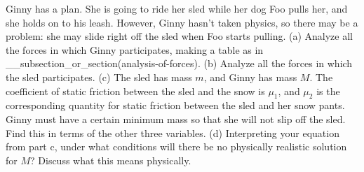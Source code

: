  Ginny has a plan. She is going to ride her sled while
her dog Foo pulls her, and she holds on to his leash.
However, Ginny hasn't taken physics,
so there may be a problem: she may slide right off the sled
when Foo starts pulling.\hwendpart
 (a) Analyze all the forces in which
Ginny participates, making a table as in __subsection_or_section(analysis-of-forces).\hwendpart
 (b) Analyze all the forces in which the sled participates.\hwendpart
 (c) The sled has mass $m$, and Ginny has mass $M$. The
coefficient of static friction between the sled and the snow
is $\mu_1$, and $\mu_2$ is the corresponding quantity for
static friction between the sled and her snow pants. Ginny
must have a certain minimum mass so that she will not slip
off the sled. Find this in terms of the other three
variables.\answercheck\hwendpart
(d) Interpreting your equation from part c, 
under what conditions will there be no physically realistic solution for $M$? Discuss
what this means physically.
